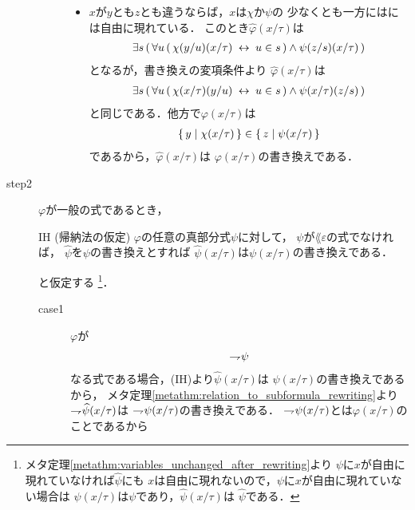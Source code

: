 \begin{metaprf}
\begin{description}
\begin{description}
\begin{itemize}
							\item $x$が$y$とも$z$とも違うならば，$x$は$\chi$か$\psi$の
								少なくとも一方にはには自由に現れている．
								このとき$\widehat{\varphi}(x/\tau)$は
								\begin{align}
									\exists s\, (\, \forall u\, (\, \chi(y/u)(x/\tau) \hspace{0.25em}\leftrightarrow\hspace{0.25em} u \in s\, ) \wedge \psi(z/s)(x/\tau)\, )
								\end{align}
								となるが，書き換えの変項条件より
								$\widehat{\varphi}(x/\tau)$は
								\begin{align}
									\exists s\, (\, \forall u\, (\, \chi(x/\tau)(y/u) \hspace{0.25em}\leftrightarrow\hspace{0.25em} u \in s\, ) \wedge \psi(x/\tau)(z/s)\, )
								\end{align}
								と同じである．他方で$\varphi(x/\tau)$は
								\begin{align}
									\{\, y \mid \chi(x/\tau)\, \} \in \{\, z \mid \psi(x/\tau)\, \}
								\end{align}
								であるから，$\widehat{\varphi}(x/\tau)$は
								$\varphi(x/\tau)$の書き換えである．
						\end{itemize}
				\end{description}
			
			\item[step2] $\varphi$が一般の式であるとき，
				\begin{itembox}[l]{IH (帰納法の仮定)}
					$\varphi$の任意の真部分式$\psi$に対して，
					$\psi$が$\lang{\varepsilon}$の式でなければ，
					$\widehat{\psi}$を$\psi$の書き換えとすれば
					$\widehat{\psi}(x/\tau)$は$\psi(x/\tau)$の書き換えである．
				\end{itembox}
				と仮定する
				\footnote{
					メタ定理\ref{metathm:variables_unchanged_after_rewriting}より
					$\psi$に$x$が自由に現れていなければ$\widehat{\psi}$にも
					$x$は自由に現れないので，$\psi$に$x$が自由に現れていない場合は
					$\psi(x/\tau)$は$\psi$であり，$\widehat{\psi}(x/\tau)$は
					$\widehat{\psi}$である．
				}．
				
				\begin{description}
					\item[case1] $\varphi$が
						\begin{align}
							\rightharpoondown\hspace{-0.25em} \psi
						\end{align}
						なる式である場合，(IH)より$\widehat{\psi}(x/\tau)$は
						$\psi(x/\tau)$の書き換えであるから，
						メタ定理\ref{metathm:relation_to_subformula_rewriting}より
						$\rightharpoondown\hspace{-0.25em} \widehat{\psi}(x/\tau)$は
						$\rightharpoondown\hspace{-0.25em} \psi(x/\tau)$の書き換えである．
						$\rightharpoondown\hspace{-0.25em} \psi(x/\tau)$とは$\varphi(x/\tau)$のことであるから
						
				\end{description}
				
		\end{description}
	\end{metaprf}